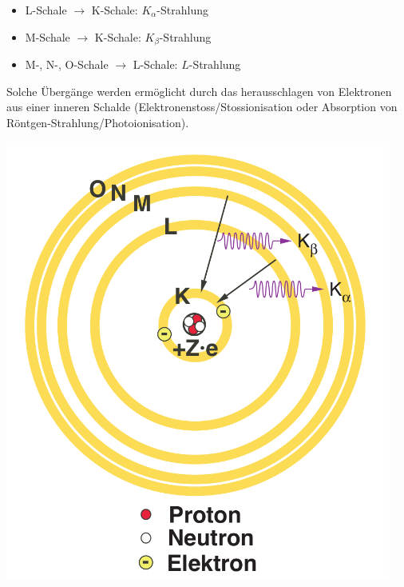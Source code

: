 \begin{minipage}[c][][b]{0.585\textwidth}
    \begin{itemize}
        \item
            L-Schale $\rightarrow$ K-Schale: $K_\alpha$-Strahlung
        \item
            M-Schale $\rightarrow$ K-Schale: $K_\beta$-Strahlung
        \item
            M-, N-, O-Schale $\rightarrow$ L-Schale: $L$-Strahlung
    \end{itemize}

    Solche  \"Uberg\"ange werden  erm\"oglicht  durch  das herausschlagen  von
    Elektronen aus einer inneren Schalde (Elektronenstoss/Stossionisation oder
    Absorption von R\"ontgen-Strahlung/Photoionisation).

\end{minipage}
\begin{minipage}[c][][b]{0.4\textwidth}
    \centering
    \includegraphics[width=0.95\textwidth]{images/charakt-strahlung.png}
    \label{fig:charaktStrahlung}
\end{minipage}

